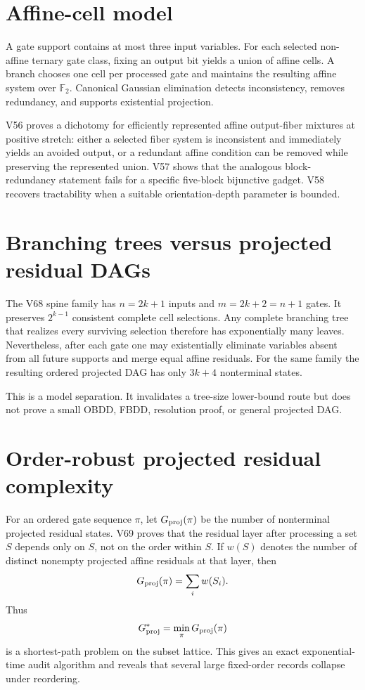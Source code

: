 \documentclass[11pt]{article}
\newcommand{\Ftwo}{\mathbb F_2}
\begin{document}
\section{Affine-cell model}
A gate support contains at most three input variables.  For each selected non-affine ternary gate class, fixing an output bit yields a union of affine cells.  A branch chooses one cell per processed gate and maintains the resulting affine system over $\Ftwo$.  Canonical Gaussian elimination detects inconsistency, removes redundancy, and supports existential projection.

V56 proves a dichotomy for efficiently represented affine output-fiber mixtures at positive stretch: either a selected fiber system is inconsistent and immediately yields an avoided output, or a redundant affine condition can be removed while preserving the represented union.  V57 shows that the analogous block-redundancy statement fails for a specific five-block bijunctive gadget.  V58 recovers tractability when a suitable orientation-depth parameter is bounded.

\section{Branching trees versus projected residual DAGs}
The V68 spine family has $n=2k+1$ inputs and $m=2k+2=n+1$ gates.  It preserves $2^{k-1}$ consistent complete cell selections.  Any complete branching tree that realizes every surviving selection therefore has exponentially many leaves.  Nevertheless, after each gate one may existentially eliminate variables absent from all future supports and merge equal affine residuals.  For the same family the resulting ordered projected DAG has only $3k+4$ nonterminal states.

This is a model separation.  It invalidates a tree-size lower-bound route but does not prove a small OBDD, FBDD, resolution proof, or general projected DAG.

\section{Order-robust projected residual complexity}
For an ordered gate sequence $\pi$, let $G_{\rm proj}(\pi)$ be the number of nonterminal projected residual states.  V69 proves that the residual layer after processing a set $S$ depends only on $S$, not on the order within $S$.  If $w(S)$ denotes the number of distinct nonempty projected affine residuals at that layer, then
\[
G_{\rm proj}(\pi)=\sum_i w(S_i).
\]
Thus
\[
G^*_{\rm proj}=\min_\pi G_{\rm proj}(\pi)
\]
is a shortest-path problem on the subset lattice.  This gives an exact exponential-time audit algorithm and reveals that several large fixed-order records collapse under reordering.
\end{document}
